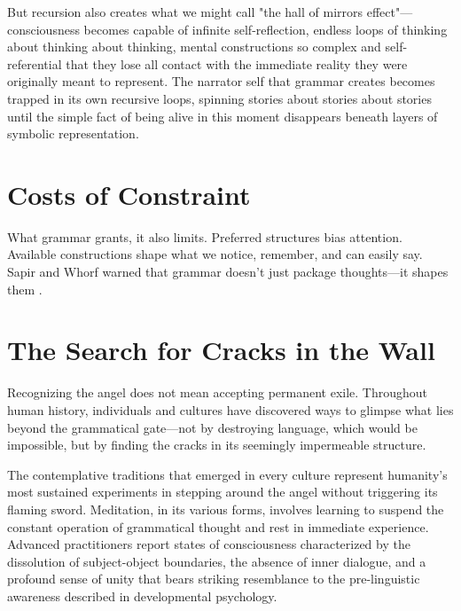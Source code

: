 But recursion also creates what we might call "the hall of mirrors effect"—consciousness becomes capable of infinite self-reflection, endless loops of thinking about thinking about thinking, mental constructions so complex and self-referential that they lose all contact with the immediate reality they were originally meant to represent. The narrator self that grammar creates becomes trapped in its own recursive loops, spinning stories about stories about stories until the simple fact of being alive in this moment disappears beneath layers of symbolic representation.

\begin{center}
\end{center}

\section{Costs of Constraint}

What grammar grants, it also limits. Preferred structures bias attention. Available constructions shape what we notice, remember, and can easily say. Sapir and Whorf warned that grammar doesn’t just package thoughts—it shapes them \parencite{sapir1929status,whorf1956language}.

\section{The Search for Cracks in the Wall}

Recognizing the angel does not mean accepting permanent exile. Throughout human history, individuals and cultures have discovered ways to glimpse what lies beyond the grammatical gate—not by destroying language, which would be impossible, but by finding the cracks in its seemingly impermeable structure.

The contemplative traditions that emerged in every culture represent humanity's most sustained experiments in stepping around the angel without triggering its flaming sword. Meditation, in its various forms, involves learning to suspend the constant operation of grammatical thought and rest in immediate experience. Advanced practitioners report states of consciousness characterized by the dissolution of subject-object boundaries, the absence of inner dialogue, and a profound sense of unity that bears striking resemblance to the pre-linguistic awareness described in developmental psychology.

